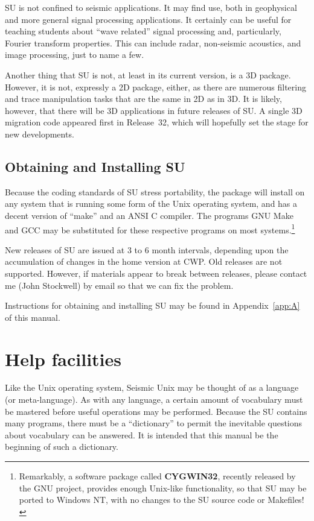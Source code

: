 SU is not confined to seismic applications. It may find use, both
in geophysical and more general signal processing applications. It certainly
can be useful for teaching students about ``wave related'' signal
processing and, particularly, Fourier transform properties.
This can include radar, non-seismic acoustics, and image processing,
just to name a few.

Another thing that SU is not, at least in its current version,
is a 3D package. However, it is not, expressly a 2D package, either,
as there are numerous filtering and trace manipulation tasks that
are the same in 2D as in 3D. It is likely, however, that there will
be 3D applications in future releases of SU. A single 3D migration
code appeared first in Release~32, which will hopefully set the
stage for new developments.

\section{Obtaining and Installing SU}

Because the coding standards of SU stress portability, the
package will install on any system that is running some form
of the Unix operating system, and has a decent version of ``make''
and an ANSI C compiler.
The programs GNU Make and GCC may be substituted for these respective
programs on most systems.\footnote{Remarkably, a software package called
{\bf CYGWIN32}, recently released by the GNU project, provides enough
Unix-like functionality, so that SU may be ported to Windows NT, 
with no changes to the SU source code or Makefiles!}

New releases of SU are issued at 3 to 6 month intervals, depending
upon the accumulation of changes in the home version at CWP.
Old releases are not supported. However, if materials appear to break
between releases, please contact me (John Stockwell) by email
so that we can fix the problem.

Instructions for obtaining and installing SU may be found in
Appendix~\ref{app:A} of this manual.

\chapter{Help facilities}

Like the Unix operating system, Seismic Unix may be thought of
as a language (or meta-language). As with any language, a certain 
amount of vocabulary must be mastered before useful operations may be
performed.
Because the SU contains many programs,
there must be a ``dictionary'' to permit the inevitable
questions about vocabulary can be answered.
It is intended that this manual be the beginning of such a dictionary.

